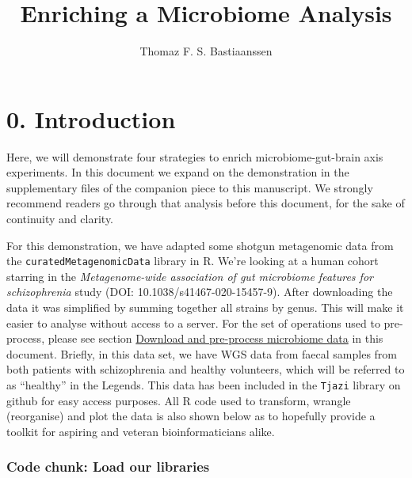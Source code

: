 \documentclass[
]{article}
\title{Enriching a Microbiome Analysis}
\author{Thomaz F. S. Bastiaanssen}
\date{}
\begin{document}
\maketitle

\hypertarget{introduction}{%
\section{0. Introduction}\label{introduction}}

Here, we will demonstrate four strategies to enrich microbiome-gut-brain
axis experiments. In this document we expand on the demonstration in the
supplementary files of the companion piece to this manuscript. We
strongly recommend readers go through that analysis before this
document, for the sake of continuity and clarity.

For this demonstration, we have adapted some shotgun metagenomic data
from the \texttt{curatedMetagenomicData} library in R. We're looking at
a human cohort starring in the \emph{Metagenome-wide association of gut
microbiome features for schizophrenia} study (DOI:
10.1038/s41467-020-15457-9). After downloading the data it was
simplified by summing together all strains by genus. This will make it
easier to analyse without access to a server. For the set of operations
used to pre-process, please see section
\href{https://github.com/thomazbastiaanssen/Tjazi/blob/master/guidebook_sup/part2/README_part2.md\#gathering-and-preparing-our-data-1}{Download
and pre-process microbiome data} in this document. Briefly, in this data
set, we have WGS data from faecal samples from both patients with
schizophrenia and healthy volunteers, which will be referred to as
``healthy'' in the Legends. This data has been included in the
\texttt{Tjazi} library on github for easy access purposes. All R code
used to transform, wrangle (reorganise) and plot the data is also shown
below as to hopefully provide a toolkit for aspiring and veteran
bioinformaticians alike.

\hypertarget{code-chunk-load-our-libraries}{%
\subsubsection{Code chunk: Load our
libraries}\label{code-chunk-load-our-libraries}}
\end{document}
